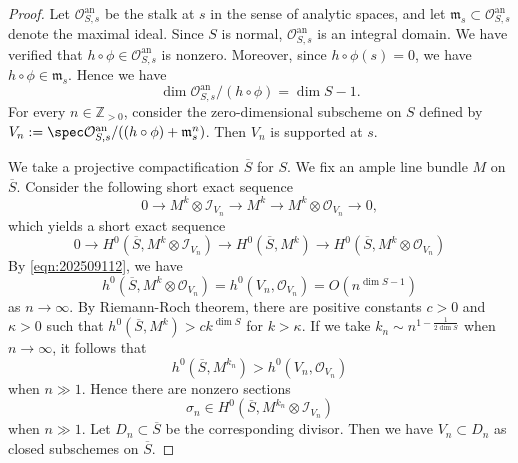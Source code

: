 \documentclass[11pt,english]{smfart}
\theoremstyle{plain}
\theoremstyle{definition}
\theoremstyle{remark}
\numberwithin{equation}{section}
\theoremstyle{plain}
\newcommand{\cO}{\mathcal O}
\newcommand{\bZ}{\mathbb{Z}}
\begin{document}
\begin{proof}
	
	
	Let $\mathcal{O}^{\mathrm{an}}_{S,s}$ be the stalk at $s$ in the sense of analytic spaces, and let $\mathfrak{m}_s \subset \mathcal{O}^{\mathrm{an}}_{S,s}$ denote the maximal ideal.
Since $S$ is normal, $\mathcal{O}^{\mathrm{an}}_{S,s}$ is an integral domain.
We have verified that $h \circ \phi \in \mathcal{O}^{\mathrm{an}}_{S,s}$ is nonzero.
Moreover, since $h \circ \phi(s) = 0$, we have $h \circ \phi\in\mathfrak{m}_s$.
Hence we have
\begin{equation}\label{eqn:202509112}
\dim \mathcal{O}^{\mathrm{an}}_{S,s}/(h \circ \phi)=\dim S-1.
\end{equation}
For every $n\in \bZ_{>0}$, consider the zero-dimensional subscheme on $S$ defined by $V_n:=\spec \cO^{\mathrm{an}}_{S,s}/((h\circ\phi)+\mathfrak{m}_s^n)$.  
	Then $V_n$ is supported at $s$.  
	
	
	We take a   projective compactification $\overline{S}$ for $S$.
	 We fix an ample line bundle $M$ on $\overline{S}$.  
	Consider the following short exact sequence 
	$$
	0\to M^k\otimes \mathcal{I}_{V_n}\to   M^k\to M^k\otimes \mathcal{O}_{V_n}\to 0,
	$$
	which yields a short exact sequence
	$$
	0\to H^0(\overline{S}, M^k\otimes \mathcal{I}_{V_n})\to   H^0(\overline{S}, M^k)\to H^0(\overline{S}, M^k\otimes \mathcal{O}_{V_n})
	$$
	By \eqref{eqn:202509112}, we have
	$$
	h^0(\overline{S}, M^k\otimes \mathcal{O}_{V_n})=h^0(V_n,  \cO_{V_n})=O(n^{\dim S-1})
	$$
	as $n\to \infty$. 
	By Riemann-Roch theorem, there are positive constants $c>0$ and $\kappa>0$ such that
	$h^0(\overline{S}, M^k)>ck^{\dim S}$ for $k>\kappa$.
	If we take $k_n\sim n^{1-\frac{1}{2\dim S}}$ when $n\to \infty$, it follows that 
	$$
	h^0(\overline{S}, M^{k_n})>h^0(V_n, \cO_{V_n})
	$$
	when $n\gg 1$. Hence there are nonzero sections 
	$$\sigma_n\in H^0(\overline{S}, M^{k_n}\otimes \mathcal{I}_{V_{n}})$$
when $n\gg 1$.  
Let $D_n\subset \overline{S}$ be the corresponding divisor.
Then we have $V_n\subset D_n$ as closed subschemes on $\overline{S}$.


\end{proof}
\end{document}
